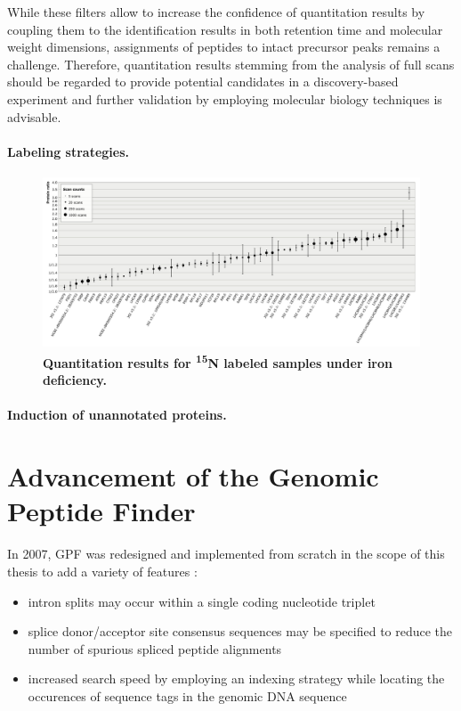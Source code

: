 While these filters allow to increase the confidence of quantitation results
by coupling them to the identification results in both retention time and
molecular weight dimensions, assignments of peptides to intact precursor
peaks remains a challenge.
Therefore, quantitation results stemming from the analysis of full scans
should be regarded to provide potential candidates in a discovery-based
experiment and further validation by employing molecular biology techniques
is advisable.

\paragraph{Labeling strategies.}

\begin{figure}
\includegraphics[width=\textwidth]{figures/qtrace-diagram.jpg}
\caption{
{\bf Quantitation results for \textsuperscript{15}N labeled \cre samples
    under iron deficiency.} 
}
\label{fig:qtrace-15n}
\end{figure}

\paragraph{Induction of unannotated proteins.}



\section{Advancement of the Genomic Peptide Finder }

In 2007, GPF was redesigned and implemented from scratch in the scope of this
thesis to add a variety of features \citep{Specht2011_GPF}:

\begin{itemize}
\item intron splits may occur within a single coding nucleotide triplet
\item splice donor/acceptor site consensus sequences may be specified to
reduce the number of spurious spliced peptide alignments
\item increased search speed by employing an indexing strategy while locating
the occurences of sequence tags in the genomic DNA sequence
\end{itemize}

